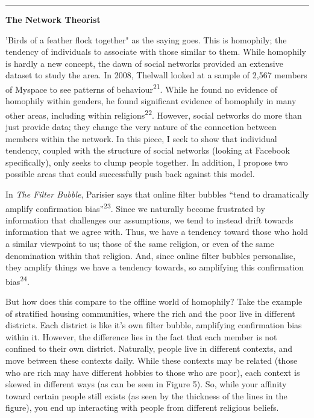 \documentclass[]{article}
\begin{document}
\begin{center}\rule{0.5\linewidth}{\linethickness}\end{center}

\textbf{The Network Theorist}

'Birds of a feather flock together" as the saying goes. This is
homophily; the tendency of individuals to associate with those similar
to them. While homophily is hardly a new concept, the dawn of social
networks provided an extensive dataset to study the area. In 2008,
Thelwall looked at a sample of 2,567 members of Myspace to see patterns
of behaviour\textsuperscript{21}. While he found no evidence of
homophily within genders, he found significant evidence of homophily in
many other areas, including within religions\textsuperscript{22}.
However, social networks do more than just provide data; they change the
very nature of the connection between members within the network. In
this piece, I seek to show that individual tendency, coupled with the
structure of social networks (looking at Facebook specifically), only
seeks to clump people together. In addition, I propose two possible
areas that could successfully push back against this model.

In \emph{The Filter Bubble}, Parisier says that online filter bubbles
``tend to dramatically amplify confirmation bias''\textsuperscript{23}.
Since we naturally become frustrated by information that challenges our
assumptions, we tend to instead drift towards information that we agree
with. Thus, we have a tendency toward those who hold a similar viewpoint
to us; those of the same religion, or even of the same denomination
within that religion. And, since online filter bubbles personalise, they
amplify things we have a tendency towards, so amplifying this
confirmation bias\textsuperscript{24}.

But how does this compare to the offline world of homophily? Take the
example of stratified housing communities, where the rich and the poor
live in different districts. Each district is like it's own filter
bubble, amplifying confirmation bias within it. However, the difference
lies in the fact that each member is not confined to their own district.
Naturally, people live in different contexts, and move between these
contexts daily. While these contexts may be related (those who are rich
may have different hobbies to those who are poor), each context is
skewed in different ways (as can be seen in Figure 5). So, while your
affinity toward certain people still exists (as seen by the thickness of
the lines in the figure), you end up interacting with people from
different religious beliefs.
\end{document}
